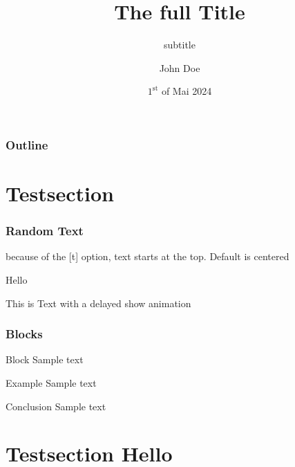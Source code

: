 \documentclass[aspectratio=169]{beamer}
\title[small title]{The full Title}
\subtitle{subtitle}
\author{John Doe}
\institute[TP III]{Chair for theoretical Physics III}
\date[01.05.2024]{$1^{\text{st}}$ of Mai 2024}
\begin{document}
\begin{frame}[t,plain] 
    \maketitle
\end{frame}

\begin{frame}
    \frametitle{Outline}
    \tableofcontents
\end{frame}

\section{Testsection}

\begin{frame}[t]
    \frametitle{Random Text}

    because of the [t] option, text starts at the top. Default is centered

    Hello\pause %
    
    This is Text with a delayed show animation
\end{frame}

\begin{frame}
    \frametitle{Blocks}

    \begin{block}{Block}
        Sample text
    \end{block}

    \begin{exampleblock}{Example}
        Sample text
    \end{exampleblock}

    \begin{alertblock}{Conclusion}
        Sample text
    \end{alertblock}
\end{frame}

\section{Testsection Hello}
\end{document}
